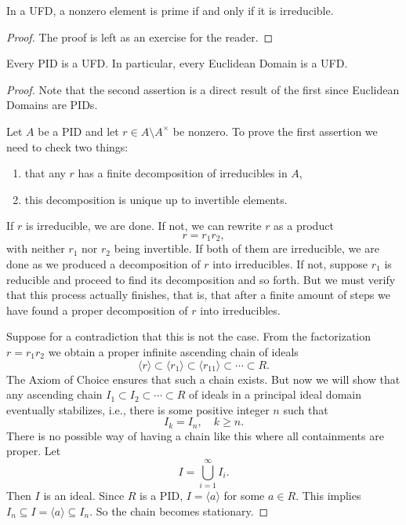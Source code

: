 \documentclass[11pt,a4paper]{article}
\begin{document}
    \begin{prop}[10.5]
    In a UFD, a nonzero element is prime if and only if it is irreducible.
    \end{prop}
    
    \begin{proof}
    The proof is left as an exercise for the reader.
    \end{proof}
    
    \begin{teo}[10.1]
    Every PID is a UFD. In particular, every Euclidean Domain is a UFD.
    \end{teo}
    
    \begin{proof}
    Note that the second assertion is a direct result of the first since Euclidean Domains are PIDs.
    
    Let $A$ be a PID and let $r \in A \setminus A^\times$ be nonzero. To prove the first assertion we need to check two things:
    \begin{enumerate}[label=(\roman*)]
        \item that any $r$ has a finite decomposition of irreducibles in $A$,
        \item this decomposition is unique up to invertible elements.
    \end{enumerate}
    
    If $r$ is irreducible, we are done. If not, we can rewrite $r$ as a product
    \[
    r = r_1 r_2,
    \]
    with neither $r_1$ nor $r_2$ being invertible. If both of them are irreducible, we are done as we produced a decomposition of $r$ into irreducibles. If not, suppose $r_1$ is reducible and proceed to find its decomposition and so forth. But we must verify that this process actually finishes, that is, that after a finite amount of steps we have found a proper decomposition of $r$ into irreducibles.
    
    Suppose for a contradiction that this is not the case. From the factorization $r = r_1 r_2$ we obtain a proper infinite ascending chain of ideals
    \[
    \langle r \rangle \subset \langle r_1 \rangle \subset \langle r_{11} \rangle \subset \cdots \subset R.
    \]
    The Axiom of Choice ensures that such a chain exists. But now we will show that any ascending chain $I_1 \subset I_2 \subset \cdots \subset R$ of ideals in a principal ideal domain eventually stabilizes, i.e., there is some positive integer $n$ such that
    \[
    I_k = I_n, \quad k \geq n.
    \]
    There is no possible way of having a chain like this where all containments are proper. Let
    \[
    I = \bigcup_{i=1}^\infty I_i.
    \]
    Then $I$ is an ideal. Since $R$ is a PID, $I = \langle a \rangle$ for some $a \in R$. This implies $I_n \subseteq I = \langle a \rangle \subseteq I_n$. So the chain becomes stationary.
    

\end{proof}
\end{document}
